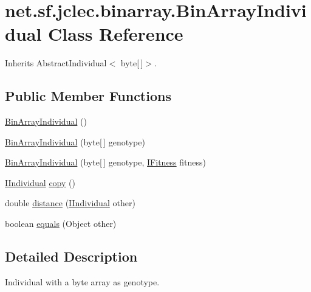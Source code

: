 \hypertarget{classnet_1_1sf_1_1jclec_1_1binarray_1_1_bin_array_individual}{\section{net.\-sf.\-jclec.\-binarray.\-Bin\-Array\-Individual Class Reference}
\label{classnet_1_1sf_1_1jclec_1_1binarray_1_1_bin_array_individual}
}


Inherits Abstract\-Individual$<$ byte\mbox{[}$\,$\mbox{]}$>$.

\subsection*{Public Member Functions}
\begin{DoxyCompactItemize}
\item 
\hyperlink{classnet_1_1sf_1_1jclec_1_1binarray_1_1_bin_array_individual_a6f3b262ce40ab0f32682db1314028a57}{Bin\-Array\-Individual} ()
\item 
\hyperlink{classnet_1_1sf_1_1jclec_1_1binarray_1_1_bin_array_individual_a4d9520028aa83ebc8d3e98b3222325ca}{Bin\-Array\-Individual} (byte\mbox{[}$\,$\mbox{]} genotype)
\item 
\hyperlink{classnet_1_1sf_1_1jclec_1_1binarray_1_1_bin_array_individual_ae4dc7399e002695b4e19b87bebde3426}{Bin\-Array\-Individual} (byte\mbox{[}$\,$\mbox{]} genotype, \hyperlink{interfacenet_1_1sf_1_1jclec_1_1_i_fitness}{I\-Fitness} fitness)
\item 
\hyperlink{interfacenet_1_1sf_1_1jclec_1_1_i_individual}{I\-Individual} \hyperlink{classnet_1_1sf_1_1jclec_1_1binarray_1_1_bin_array_individual_a72eb137ff7c41ebd5550912fa471e445}{copy} ()
\item 
double \hyperlink{classnet_1_1sf_1_1jclec_1_1binarray_1_1_bin_array_individual_aeea50e4dfb9c21f14f26ac07b158e0d0}{distance} (\hyperlink{interfacenet_1_1sf_1_1jclec_1_1_i_individual}{I\-Individual} other)
\item 
boolean \hyperlink{classnet_1_1sf_1_1jclec_1_1binarray_1_1_bin_array_individual_a5a3976a715d5c315a39e7969f0e64be6}{equals} (Object other)
\end{DoxyCompactItemize}


\subsection{Detailed Description}
Individual with a byte array as genotype.

